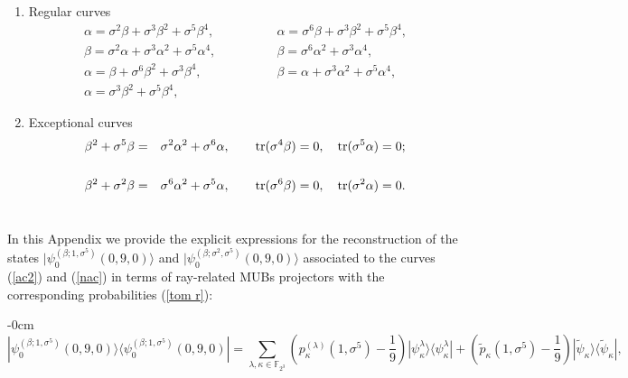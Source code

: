 \documentclass[quantumrep,article,submit,pdftex,moreauthors]{Definitions/mdpi}
\DeclareMathOperator{\tr}{tr}
\begin{document}
\begin{enumerate}[label = \alph*)]
  \item Regular curves 
    \begin{equation}
      \begin{array}{ll}
        \alpha = \sigma^{2}\beta + \sigma^{3}\beta^{2} + \sigma^{5}\beta^{4},
        \qquad\qquad
        & \alpha = \sigma^{6}\beta + \sigma^{3}\beta^{2} + \sigma^{5}\beta^{4},
        \\[5pt] 
        \beta = \sigma^{2}\alpha + \sigma^{3}\alpha^{2} + \sigma^{5}\alpha^{4},
        \qquad\qquad
        & \beta = \sigma^{6}\alpha^{2} + \sigma^{3}\alpha^{4}, \\[5pt] 
        \alpha = \beta + \sigma^{6}\beta^{2} + \sigma^{3}\beta^{4},
        \qquad\qquad
        & \beta = \alpha + \sigma^{3}\alpha^{2} + \sigma^{5}\alpha^{4}, \\[5pt] 
        \alpha = \sigma^{3}\beta^{2} + \sigma^{5}\beta^{4},
        \qquad\qquad
        & 
      \end{array}%
    \end{equation}

  \item Exceptional curves 
    \begin{eqnarray}
      \beta^{2}+\sigma^{5}\beta
      &=& \sigma^{2}\alpha^{2}+\sigma^{6}\alpha,
      \qquad \tr(\sigma^{4}\beta)=0,\quad \tr(\sigma^{5}\alpha) = 0;
      \notag \\
      && \\
      \beta^{2}+\sigma^{2}\beta
      &=& \sigma^{6}\alpha^{2} + \sigma^{5}\alpha,
      \qquad \tr(\sigma^{6}\beta) = 0,
      \quad \tr(\sigma^{2}\alpha) = 0.
      \notag
    \end{eqnarray}
\end{enumerate}

\section[\appendixname~\thesection]{}
\label{appC}

In this Appendix we provide the explicit expressions for the reconstruction of
the states $|\psi_{0}^{(\beta;1,\sigma^{5})}(0,9,0)\rangle$ and
$|\psi_{0}^{(\beta ;\sigma^{2},\sigma^{5})}(0,9,0)\rangle$ associated to the
curves (\ref{ac2}) and (\ref{nac}) in terms of ray-related MUBs projectors with
the corresponding probabilities (\ref{tom r}):

\begin{adjustwidth}{-\extralength}{0cm}
\begin{equation}
  |\psi _{0}^{(\beta ;1, \sigma^{5})}(0,9,0)\rangle
  \langle \psi_{0}^{(\beta;1,\sigma^{5})}(0,9,0)|
  = \sum_{\lambda ,\kappa \in \mathbb{F}_{2^{3}}}
  \left( p_{\kappa }^{(\lambda )}(1,\sigma ^{5})-\frac{1}{9}\right)
  |\psi_{\kappa}^{\lambda }\rangle \langle \psi_{\kappa }^{\lambda }|
  + \left( \tilde{p}_{\kappa }(1,\sigma ^{5})-\frac{1}{9}\right)
  |\tilde{\psi}_{\kappa }\rangle \langle \tilde{\psi}_{\kappa }|,
  \label{ac recon}
\end{equation}
\end{adjustwidth}
\end{document}
